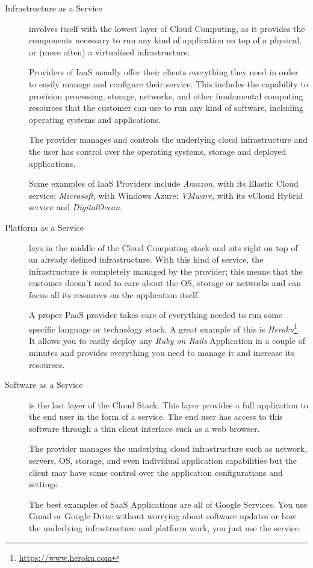 \begin{description}
\item[Infrastructure as a Service] involves itself with the lowest layer of Cloud Computing, as it provides the components necessary to run any kind of application on top of a physical, or (more often) a virtualized infrastructure.

Providers of \ac{IaaS} usually offer their clients everything they need in order to easily manage and configure their service. This includes the capability to provision processing, storage, networks, and other fundamental computing resources that the customer can use to run any kind of software, including operating systems and applications. 

The provider manages and controls the underlying cloud infrastructure and the user has control over the operating systems, storage and deployed applications.
\cite[p. 8]{sabharwal:2013}

Some examples of \ac{IaaS} Providers include \textit{Amazon}, with its Elastic Cloud service; \textit{ Microsoft}, with Windows Azure; \textit{VMware}, with its vCloud Hybrid service and \textit{DigitalOcean}.
 
\item[Platform as a Service] lays in the middle of the Cloud Computing stack and sits right on top of an already defined infrastructure. With this kind of service, the infrastructure is completely managed by the provider; this means that the customer doesn't need to care about the \ac{OS}, storage or networks and can focus all its resources on the application itself.
\cite[p. 9]{mcgrath:2012}

A proper \ac{PaaS} provider takes care of everything needed to run some specific language or technology stack. A great example of this is \textit{Heroku}\footnote{\url{https://www.heroku.com}}. It allows you to easily deploy any \textit{Ruby on Rails} Application in a couple of minutes and provides everything you need to manage it and increase its resources.

\item[Software as a Service] is the last layer of the Cloud Stack. This layer provides a full application to the end user in the form of a service. The end user has access to this software through a thin client interface such as a web browser. 

The provider manages the underlying cloud infrastructure such as network, servers, \ac{OS}, storage, and even individual application capabilities but the client may have some control over the application configurations and settings.
\cite[p. 9]{sabharwal:2013}

The best examples of \ac{SaaS} Applications are all of Google Services. You use Gmail or Google Drive without worrying about software updates or how the underlying infrastructure and platform work, you just use the service.
\end{description}

